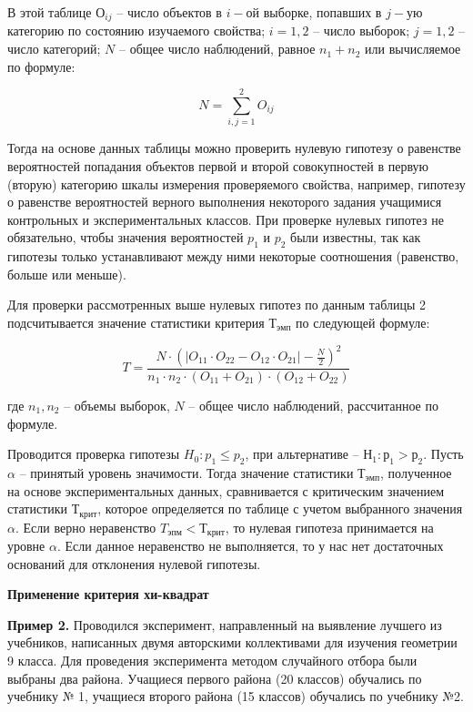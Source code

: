 \documentclass[12pt]{article}
\begin{document}
В этой таблице $О_{ij}$ – число объектов в $i-ой$ выборке, попавших в $j-ую$ категорию по состоянию изучаемого свойства; $i=1,2$ – число выборок; $j=1,2$ – число категорий; $N$ – общее число наблюдений, равное  $n_1+n_2$ или вычисляемое по формуле:

\begin{equation}
    N=\sum_{i,j=1}^{2} O_{ij}
\end{equation}

Тогда на основе данных таблицы  можно проверить нулевую гипотезу о равенстве вероятностей попадания объектов первой и второй совокупностей в первую (вторую) категорию шкалы измерения проверяемого свойства, например, гипотезу о равенстве вероятностей верного выполнения некоторого задания учащимися контрольных и экспериментальных классов.
При проверке нулевых гипотез не обязательно, чтобы значения вероятностей $p_1$ и $p_2$ были известны, так как гипотезы только устанавливают между ними некоторые соотношения (равенство, больше или меньше).

Для проверки рассмотренных выше нулевых гипотез по данным таблицы 2 подсчитывается значение статистики критерия $Т_{эмп}$ по следующей формуле:

\begin{equation}
    T=\frac{N\cdot (|O_{11} \cdot O_{22} -O_{12} \cdot O_{21}| - \frac{N}{2})^2}{n_1 \cdot n_2 \cdot (O_{11} + O_{21}) \cdot (O_{12} + O_{22})}
\end{equation}
                                            
где $n_1, n_2$ – объемы выборок, $N$ – общее число наблюдений, рассчитанное по формуле.

Проводится проверка гипотезы $H_0: p_1 \leq p_2$, при альтернативе – $Н_1: р_1 > р_2$. Пусть $\alpha$ – принятый уровень значимости. Тогда значение статистики $Т_{эмп}$, полученное на основе экспериментальных данных, сравнивается с критическим значением статистики $Т_{крит}$, которое определяется по таблице  с учетом выбранного значения $\alpha$. Если верно неравенство $T_{эпм}<Т_{крит}$, то нулевая гипотеза принимается на уровне $\alpha$. Если данное неравенство не выполняется, то у нас нет достаточных оснований для отклонения нулевой гипотезы.

\medskip
\textbf{Применение критерия хи-квадрат}

\medskip
\textbf{Пример 2.} Проводился эксперимент, направленный на выявление лучшего из учебников, написанных двумя авторскими коллективами для изучения геометрии 9 класса. Для проведения эксперимента методом случайного отбора были выбраны два района. Учащиеся первого района (20 классов) обучались по учебнику № 1, учащиеся второго района (15 классов) обучались по учебнику №2.
\end{document}
